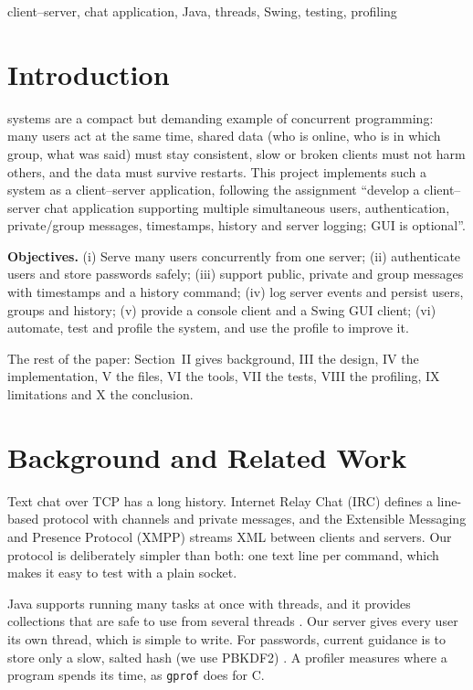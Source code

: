 \documentclass[conference]{IEEEtran}
\newcommand{\code}[1]{\texttt{#1}}
\begin{document}
\begin{IEEEkeywords}
client--server, chat application, Java, threads, Swing, testing, profiling
\end{IEEEkeywords}

\section{Introduction}
 systems are a compact but demanding example of concurrent programming: many users act at the same time,
shared data (who is online, who is in which group, what was said) must stay consistent, slow or broken clients must not harm others,
and the data must survive restarts. This project implements such a system as a client--server application, following the assignment
``develop a client--server chat application supporting multiple simultaneous users, authentication, private/group messages,
timestamps, history and server logging; GUI is optional''.

\textbf{Objectives.}
(i) Serve many users concurrently from one server;
(ii) authenticate users and store passwords safely;
(iii) support public, private and group messages with timestamps and a history command;
(iv) log server events and persist users, groups and history;
(v) provide a console client and a Swing GUI client;
(vi) automate, test and profile the system, and use the profile to improve it.

The rest of the paper: Section~II gives background, III the design, IV the implementation, V the files, VI the tools, VII the tests, VIII the profiling, IX limitations and X the conclusion.

\section{Background and Related Work}
Text chat over TCP has a long history. Internet Relay Chat (IRC) \cite{rfc1459} defines a line-based protocol with channels
and private messages, and the Extensible Messaging and Presence Protocol (XMPP) \cite{rfc6120} streams XML between clients and servers.
Our protocol is deliberately simpler than both: one text line per command, which makes it easy to test with a plain socket.

Java supports running many tasks at once with threads, and it provides collections that are safe to use from several threads \cite{jcip,jdkapi}. Our server gives every user its own thread, which is simple to write. For passwords, current guidance is to store only a slow, salted hash (we use PBKDF2) \cite{rfc8018,owasp}. A profiler measures where a program spends its time, as \code{gprof} does for C.
\end{document}
